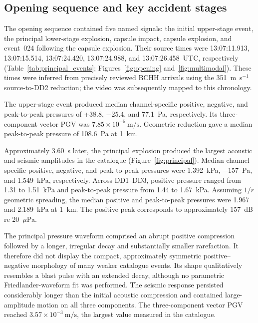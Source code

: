 \documentclass[]{seismica}
\begin{document}
\subsection{Opening sequence and key accident stages}
\label{sec:results_principal}

The opening sequence contained five named signals: the initial upper-stage
event, the principal lower-stage explosion, capsule impact, capsule explosion,
and event~024 following the capsule explosion. Their source times were
13:07:11.913, 13:07:15.514, 13:07:24.420, 13:07:24.988, and 13:07:26.458~UTC,
respectively (Table~\ref{tab:principal_events}; Figures~\ref{fig:opening}
and~\ref{fig:multimodal}). These times were inferred from precisely reviewed
BCHH arrivals using the 351~m~s$^{-1}$ source-to-DD2 reduction; the video was
subsequently mapped to this chronology.

The upper-stage event produced median channel-specific positive, negative, and
peak-to-peak pressures of +38.8, $-25.4$, and 77.1~Pa, respectively. Its
three-component vector PGV was
$7.85\times10^{-5}\ \si{\metre\per\second}$. Geometric reduction gave a
median peak-to-peak pressure of 108.6~Pa at 1~km.

Approximately \SI{3.60}{\second} later, the principal explosion produced the
largest acoustic and seismic amplitudes in the catalogue
(Figure~\ref{fig:principal}). Median channel-specific positive, negative, and
peak-to-peak pressures were \SI{1.392}{\kilo\pascal},
\SI{-157}{\pascal}, and \SI{1.549}{\kilo\pascal}, respectively. Across
DD1--DD3, positive pressure ranged from 1.31 to 1.51~kPa and peak-to-peak
pressure from 1.44 to 1.67~kPa. Assuming $1/r$ geometric spreading, the median
positive and peak-to-peak pressures were 1.967 and 2.189~kPa at 1~km. The
positive peak corresponds to approximately 157~dB re 20~$\mu$Pa.

The principal pressure waveform comprised an abrupt positive compression
followed by a longer, irregular decay and substantially smaller rarefaction. It
therefore did not display the compact, approximately symmetric positive--negative
morphology of many weaker catalogue events. Its shape qualitatively resembles a
blast pulse with an extended decay, although no parametric Friedlander-waveform
fit was performed. The seismic response persisted considerably longer than the
initial acoustic compression and contained large-amplitude motion on all three
components. The three-component vector PGV reached
$3.57\times10^{-3}\ \si{\metre\per\second}$, the largest value measured in the
catalogue.
\end{document}

